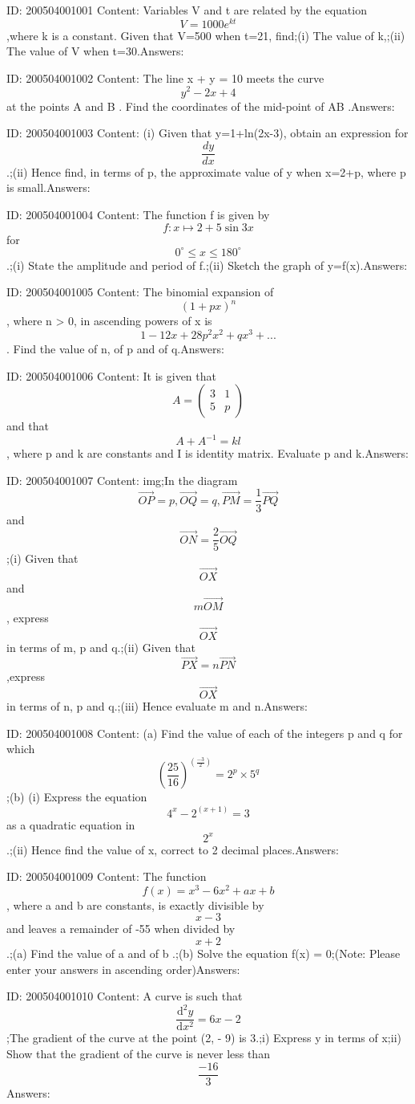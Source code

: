 \documentclass{article}
\begin{document}
ID: 200504001001
Content:
Variables V and t are related by the equation $$V=1000e^{kt}$$ ,where k is a constant. Given that V=500 when t=21, find;(i) The value of k,;(ii) The value of V when t=30.Answers:

ID: 200504001002
Content:
The line x + y = 10 meets the curve $$y^2-2x+4$$ at the points A and B . Find the coordinates of the mid-point of AB .Answers:

ID: 200504001003
Content:
(i)	Given that y=1+ln(2x-3), obtain an expression for $$\frac{dy}{dx}$$.;(ii)	Hence find, in terms of p, the approximate value of y when x=2+p, where p is small.Answers:

ID: 200504001004
Content:
The function f is given by $$f: x \mapsto 2+5\sin 3x$$ for $$0 ^{\circ}\leq x\leq180 ^{\circ}$$.;(i) State the amplitude and period of f.;(ii)	Sketch the graph of y=f(x).Answers:

ID: 200504001005
Content:
The binomial expansion of $$(1+px)^n$$, where n > 0, in ascending powers of x is $$1-12x+28p^2x^2+qx^3+...$$. Find the value of n, of p and of q.Answers:

ID: 200504001006
Content:
It is given that $$A= \begin{pmatrix}3 & 1\\  5& p\end{pmatrix}$$ and that $$A+A^{-1}=kl$$, where p and k are constants and I is identity matrix. Evaluate p and k.Answers:

ID: 200504001007
Content:
img;In the diagram $$\vec{OP}=p, \vec{OQ}=q, \vec{PM}= \frac{1}{3}\vec{PQ}$$ and $$\vec{ON}= \frac{2}{5}\vec{OQ}$$;(i)	Given that $$\vec{OX}$$ and $$m \vec{OM}$$, express $$\vec{OX}$$ in terms of m, p and q.;(ii)	Given that $$\vec{PX}=n \vec{PN}$$,express $$\vec{OX}$$ in terms of n, p and q.;(iii)	Hence evaluate m and n.Answers:

ID: 200504001008
Content:
(a)	Find the value of each of the integers p and q for which $$( \frac{25}{16})^{( \frac{-3}{2})}=2^p \times 5^q$$;(b)	(i) Express the equation $$4^x-2^{(x+1)}=3$$ as a quadratic equation in $$2^x$$.;(ii) Hence find the value of x, correct to 2 decimal places.Answers:

ID: 200504001009
Content:
The function $$f(x)=x^3-6x^2+ax+b$$, where a and b are constants, is exactly divisible by $$x-3$$ and leaves a remainder of -55 when divided by $$x + 2$$.;(a)	Find the value of a and of b .;(b)	Solve the equation f(x) = 0;(Note: Please enter your answers in ascending order)Answers:

ID: 200504001010
Content:
A curve is such that $$ \frac{\mathrm{d} ^{2}y}{\mathrm{d} x^{2}}=6x-2$$;The gradient of the curve at the point (2, - 9) is 3.;i) Express y in terms of x;ii) Show that the gradient of the curve is never less than $$\frac{-16}{3}$$Answers:
\end{document}
